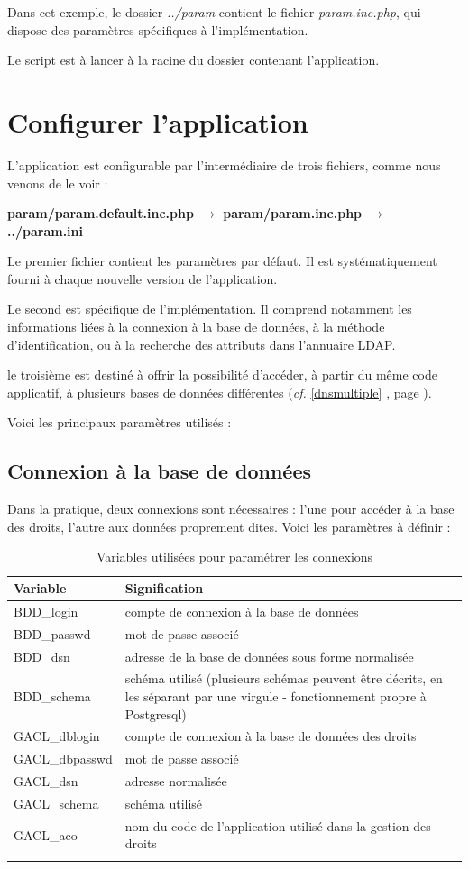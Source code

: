 Dans cet exemple, le dossier \textit{../param} contient le fichier \textit{param.inc.php}, qui dispose des paramètres spécifiques à l'implémentation.

Le script est à lancer à la racine du dossier contenant l'application.

\section{Configurer l'application}

L'application est configurable par l'intermédiaire de trois fichiers, comme nous venons de le voir :

\textbf{param/param.default.inc.php $\rightarrow$ param/param.inc.php $\rightarrow$ ../param.ini}

Le premier fichier contient les paramètres par défaut. Il est systématiquement fourni à chaque nouvelle version de l'application.

Le second est spécifique de l'implémentation. Il comprend notamment les informations liées à la connexion à la base de données, à la méthode d'identification, ou à la recherche des attributs dans l'annuaire LDAP. 

le troisième est destiné à offrir la possibilité d'accéder, à partir du même code applicatif, à plusieurs bases de données différentes (\textit{cf.} \ref{dnsmultiple} \textit{}, page \pageref{dnsmultiple}).

Voici les principaux paramètres utilisés :

\subsection{Connexion à la base de données}

Dans la pratique, deux connexions sont nécessaires : l'une pour accéder à la base des droits, l'autre aux données proprement dites. Voici les paramètres à définir :

\begin{longtable}{|p{4cm}|p{11cm}|}
\hline
\textbf{Variable} & \textbf{Signification} \\
\hline
\endhead
BDD\_login & compte de connexion à la base de données \\
\hline
BDD\_passwd & mot de passe associé\\
\hline
BDD\_dsn & adresse de la base de données sous forme normalisée\\
\hline
BDD\_schema & schéma utilisé (plusieurs schémas peuvent être décrits, en les séparant par une virgule - fonctionnement propre à Postgresql)\\
\hline
GACL\_dblogin & compte de connexion à la base de données des droits\\
\hline
GACL\_dbpasswd & mot de passe associé\\
\hline
GACL\_dsn & adresse normalisée \\
\hline
GACL\_schema & schéma utilisé\\
\hline
GACL\_aco & nom du code de l'application utilisé dans la gestion des droits\\
\hline
\caption{Variables utilisées pour paramétrer les connexions}
\end{longtable}

